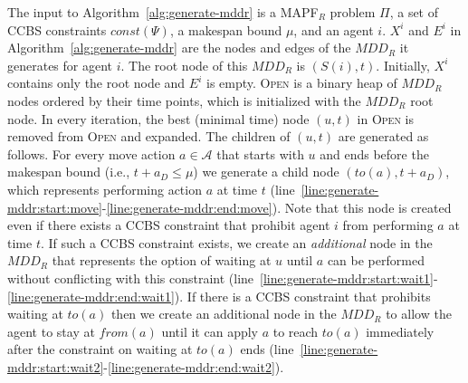 \documentclass[review]{elsarticle}
\newcommand{\mddr}{\ensuremath{MDD_R}\xspace}
\newcommand{\source}{\ensuremath{S}\xspace}
\newcommand{\fromv}{\ensuremath{\mathit{from}}\xspace}
\newcommand{\tov}{\ensuremath{\mathit{to}}\xspace}
\newcommand{\ccbs}{\ac{CCBS}\xspace}
\newcommand{\csipp}{\ac{CSIPP}\xspace}
\newcommand{\mapfr}{\ac{MAPF}$_R$\xspace}
\newcommand{\musmtccbs}{\ensuremath{\mu}SMT-CCBS\xspace}
\newcommand{\const}{\textit{const}\xspace}
\newcommand{\OPEN}{\textsc{Open}\xspace}
\begin{document}

The input to Algorithm~\ref{alg:generate-mddr} is a \mapfr problem $\Pi$, 
a set of \ccbs constraints $\const(\Psi)$, 
a makespan bound $\mu$, 
and an agent $i$.  
$X^i$ and $E^i$ in Algorithm~\ref{alg:generate-mddr} are the nodes and edges of the \mddr it generates for agent $i$. 
The root node of this \mddr is $(\source(i),t)$. 
Initially, $X^i$ contains only the root node and $E^i$ is empty. 
\OPEN is a binary heap of \mddr nodes ordered by their time points, 
which is initialized with the \mddr root node. 
In every iteration, the best (minimal time) node $(u,t)$ in \OPEN is removed from \OPEN and expanded. 
The children of $(u,t)$ are generated as follows. 
For every move action $a\in \mathcal{A}$ that starts with $u$ and ends before the makespan bound (i.e., $t+a_D\leq \mu$) 
we generate a child node $(\tov(a),t+a_D)$, which represents performing action $a$ at time $t$ (line~\ref{line:generate-mddr:start:move}-\ref{line:generate-mddr:end:move}). 
Note that this node is created even if there exists a \ccbs constraint that prohibit agent $i$ from performing $a$ at time $t$. 
If such a \ccbs constraint exists, we create an \emph{additional} node in the \mddr that represents the option of waiting at $u$ until $a$ can be performed without conflicting with this constraint (line~\ref{line:generate-mddr:start:wait1}-\ref{line:generate-mddr:end:wait1}). 
If there is a \ccbs constraint that prohibits waiting at $\tov(a)$ then we create an additional node in the \mddr to allow the agent to stay at $\fromv(a)$ until it can apply $a$ to reach $\tov(a)$ immediately after the constraint on waiting at $\tov(a)$ ends (line~\ref{line:generate-mddr:start:wait2}-\ref{line:generate-mddr:end:wait2}). 
\end{document}
